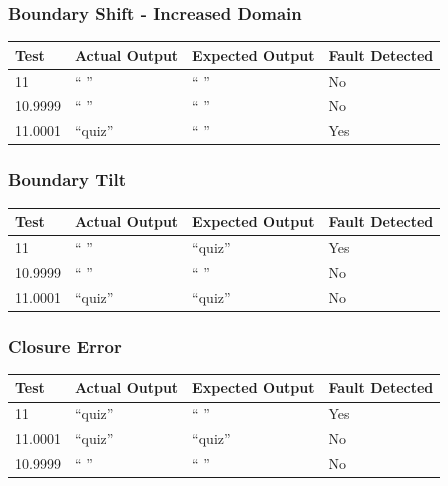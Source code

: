 \documentclass[11pt, oneside]{article}   	%
\begin{document}
\subsubsection{Boundary Shift - Increased Domain}
\begin{table}[!htb]
\centering
\begin{tabular}{|l|l|l|l|}
\hline
Test    & Actual Output & Expected Output & Fault Detected \\ \hline
11      & “ ”           & “ ”             & No             \\ \hline
10.9999 & “ ”           & “ ”             & No             \\ \hline
11.0001 & “quiz”        & “ ”             & Yes            \\ \hline
\end{tabular}
\end{table}

\subsubsection{Boundary Tilt}
\begin{table}[!htb]
\centering
\begin{tabular}{|l|l|l|l|}
\hline
Test    & Actual Output & Expected Output & Fault Detected \\ \hline
11      & “ ”           & “quiz”          & Yes            \\ \hline
10.9999 & “ ”           & “ ”             & No             \\ \hline
11.0001 & “quiz”        & “quiz”          & No             \\ \hline
\end{tabular}
\end{table}

\subsubsection{Closure Error}
\begin{table}[!htb]
\centering
\begin{tabular}{|l|l|l|l|}
\hline
Test    & Actual Output & Expected Output & Fault Detected \\ \hline
11      & “quiz”        & “ ”             & Yes            \\ \hline
11.0001 & “quiz”        & “quiz”          & No             \\ \hline
10.9999 & “ ”           & “ ”             & No             \\ \hline
\end{tabular}
\end{table}
\newpage
\end{document}
